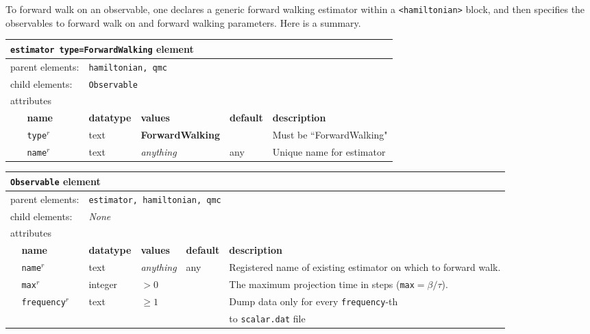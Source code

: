 To forward walk on an observable, one declares a generic forward walking estimator within a \texttt{<hamiltonian>} block, and then specifies the observables to forward walk on and forward walking parameters.  Here is a summary.  

\begin{table}[h]
\begin{center}
\begin{tabularx}{\textwidth}{l l l l l l }
\hline
\multicolumn{6}{l}{\texttt{estimator type=ForwardWalking} element} \\
\hline
\multicolumn{2}{l}{parent elements:} & \multicolumn{4}{l}{\texttt{hamiltonian, qmc}}\\
\multicolumn{2}{l}{child  elements:} & \multicolumn{4}{l}{\texttt{Observable}}\\
\multicolumn{2}{l}{attributes}  & \multicolumn{4}{l}{}\\
   & \bfseries name       & \bfseries datatype & \bfseries values  & \bfseries default   & \bfseries description \\
   & \texttt{type}$^r$    &  text              & \textbf{ForwardWalking}&                & Must be ``ForwardWalking" \\
   & \texttt{name}$^r$    &  text              & \textit{anything} & any                 & Unique name for estimator \\
  \hline
\end{tabularx}
\end{center}
\end{table}

\begin{table}[h]
\begin{center}
\begin{tabularx}{\textwidth}{l l l l l l }
\hline
\multicolumn{6}{l}{\texttt{Observable} element} \\
\hline
\multicolumn{2}{l}{parent elements:} & \multicolumn{4}{l}{\texttt{estimator, hamiltonian, qmc}}\\
\multicolumn{2}{l}{child  elements:} & \multicolumn{4}{l}{\textit{None}}\\
\multicolumn{2}{l}{attributes}  & \multicolumn{4}{l}{}\\
   & \bfseries name       & \bfseries datatype & \bfseries values  & \bfseries default   & \bfseries description \\
   & \texttt{name}$^r$    &  text              & \textit{anything} & any                 & Registered name of existing estimator on which to forward walk. \\
   & \texttt{max}$^r$     &  integer             & $ > 0$     &                     & The maximum projection time in steps (\texttt{max}$=\beta/\tau$).      \\
   & \texttt{frequency}$^r$     &  text              & $\geq 1$      &                & Dump data only for every \texttt{frequency}-th  \\
      &  &               &     &                & to \texttt{scalar.dat} file   \\

  \hline
\end{tabularx}
\end{center}
\end{table}

